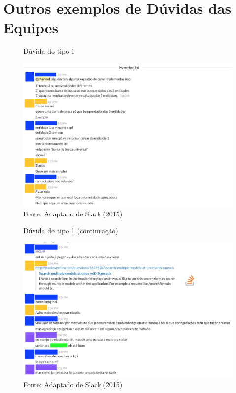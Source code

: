 \anexo
\chapter{Outros exemplos de Dúvidas das Equipes}

\begin{figure}[h!]
	\centering
    \caption{Dúvida do tipo 1}
    \includegraphics[width=15cm]{Imagens/c-type-1-1-1-a.png}
	\caption*{Fonte: Adaptado de Slack (2015)}
\end{figure}

\begin{figure}[h!]
	\centering
    \caption{Dúvida do tipo 1 (continuação)}
    \includegraphics[width=15cm]{Imagens/c-type-1-1-2-a.png}
	\caption*{Fonte: Adaptado de Slack (2015)}
\end{figure}

